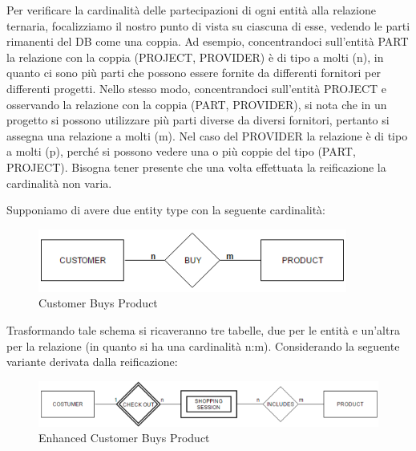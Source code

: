 Per verificare la cardinalità delle partecipazioni di ogni entità alla relazione ternaria, focalizziamo il nostro punto di vista su ciascuna di esse, vedendo le parti rimanenti del DB come una coppia. 
Ad esempio, concentrandoci sull’entità PART la relazione con la coppia (PROJECT, PROVIDER) è di tipo a molti (n), in quanto ci sono più parti che possono essere fornite da differenti fornitori per differenti progetti. Nello stesso modo, concentrandoci sull’entità PROJECT e osservando la relazione con la coppia (PART, PROVIDER), si nota che in un progetto si possono utilizzare più parti diverse da diversi fornitori, pertanto si assegna una relazione a molti (m). Nel caso del PROVIDER la relazione è di tipo a molti (p), perché si possono vedere una o più coppie del tipo (PART, PROJECT). 
Bisogna tener presente che una volta effettuata la reificazione la cardinalità non varia.                           

Supponiamo di avere due entity type con la seguente cardinalità:  

\begin{center}
\begin{figure}[H]
\centering
\includegraphics[scale=1]{figures/cbuyp2.png}
\caption{Customer Buys Product}
\end{figure}
\end{center}

Trasformando tale schema si ricaveranno tre tabelle, due per le entità e un’altra per la relazione (in quanto si ha una cardinalità n:m). Considerando la seguente variante derivata dalla reificazione:

\begin{center}
\begin{figure}[H]
\centering
\includegraphics[scale=1]{figures/cbuyp_checkout.png}
\caption{Enhanced Customer Buys Product}
\end{figure}
\end{center}

